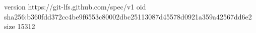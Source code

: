 version https://git-lfs.github.com/spec/v1
oid sha256:b360fdd372cc4be9f6553c80002dbc25113087d45578d0921a359a42567dd6e2
size 15312
